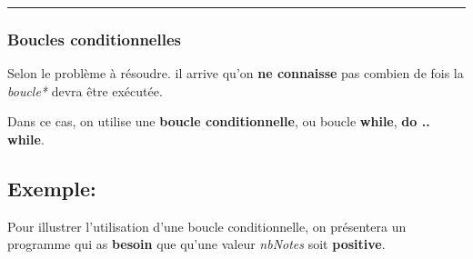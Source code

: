 \documentclass[letterpaper,10pt,english]{sphinxmanual}
\begin{document}
\bigskip\hrule{}\bigskip



\subsubsection{Boucles conditionnelles}
\label{structures1:boucles-conditionnelles}
Selon le problème à résoudre. il arrive qu'on \textbf{ne connaisse} pas combien de fois la \emph{boucle*} devra être exécutée.

Dans ce cas, on utilise une \textbf{boucle conditionnelle}, ou boucle \textbf{while}, \textbf{do .. while}.


\subsection{Exemple:}
\label{structures1:id2}
Pour illustrer l'utilisation d'une boucle conditionnelle, on présentera un programme qui  as \textbf{besoin} que qu'une valeur \emph{nbNotes} soit \textbf{positive}.
\end{document}
